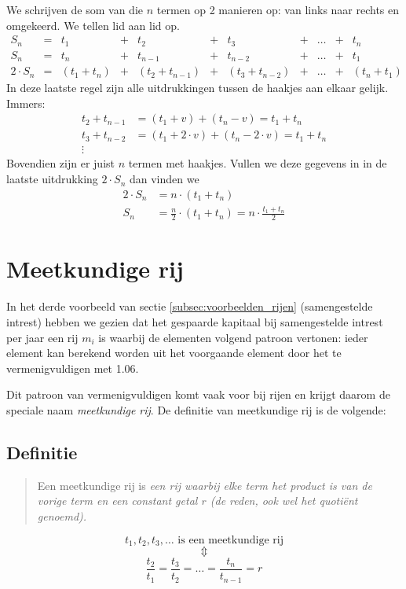 We schrijven de som van die $n$ termen op 2 manieren op: van links naar
rechts en omgekeerd. We tellen lid aan lid op.
\begin{displaymath}
    \begin{array}{ccccccccccc}
    S_{n} & = & t_{1} & + & t_{2} & + & t_{3} & + &
    \ldots & + & t_{n}  \\
    S_{n} & = & t_{n} & + & t_{n-1} & + & t_{n-2} & + &
    \ldots & + & t_{1}  \\
    \hline
    2\cdot S_{n} & = & (t_{1}+t_{n}) & + & (t_{2}+t_{n-1}) & + &
    (t_{3}+t_{n-2}) & + & \ldots & + & (t_{n}+t_{1})
\end{array}
\end{displaymath}
In deze laatste regel zijn alle uitdrukkingen tussen de haakjes aan
elkaar gelijk.
Immers:
\begin{align*}
    t_{2}+t_{n-1} &=  (t_{1}+ v)+(t_{n}-v)=t_{1}+t_{n} \\
    t_{3}+t_{n-2} &=  (t_{1}+2\cdot v)+(t_{n}-2\cdot v)= t_{1}+t_{n} \\
     \vdots & 
\end{align*}
Bovendien zijn er juist $n$ termen met haakjes.
Vullen we deze gegevens in in de laatste uitdrukking $2\cdot S_{n}$
dan vinden we
\begin{align*}
    2\cdot S_{n} &=  n\cdot (t_{1}+t_{n})  \\
    S_{n} &= \frac{n}{2}\cdot (t_{1}+t_{n})=n \cdot \frac{t_{1}+t_{n}}{2}
  \end{align*}

\section{Meetkundige rij}
\label{sec:MR}
In het derde voorbeeld van sectie \ref{subsec:voorbeelden_rijen} (samengestelde intrest) hebben we gezien dat het gespaarde kapitaal bij samengestelde  intrest per jaar een rij $m_i$ is waarbij de elementen volgend patroon vertonen:  ieder element kan berekend worden uit het voorgaande element door het te vermenigvuldigen met \num{1.06}.

Dit patroon van vermenigvuldigen komt vaak voor bij rijen en krijgt daarom de speciale naam \emph{meetkundige  rij}. De definitie van meetkundige rij is de volgende:
\subsection{Definitie}
\begin{quote}
Een meetkundige rij is \emph{een rij waarbij elke term het product is van de vorige term en een constant getal $r$ (de \emph{reden}, ook wel het \emph{quotiënt} genoemd).}
\end{quote}
    \begin{displaymath}
             t_1, t_2, t_3, \dots 
        \mbox{ is een meetkundige rij}
    \end{displaymath}
    \begin{displaymath}
         \Updownarrow
    \end{displaymath}
    \begin{displaymath}
         \frac{t_{2}}{t_{1}}=\frac{t_{3}}{t_{2}}=\dots =\frac{t_{n}}{t_{n-1}}=r
    \end{displaymath}

